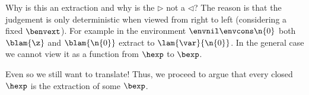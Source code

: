 Why is this an extraction and why is the $\rhd$ not a $\lhd$?
The reason is that the judgement is only deterministic when viewed from right to left (considering a fixed $\benvext$).
For example in the environment $\envnil \envcons \n{0}$ both $\blam{\z}$ and $\blam{\n{0}}$ extract to $\lam{\var}{\n{0}}$.
In the general case we cannot view it as a function from $\hexp$ to $\bexp$.

Even so we still want to translate!
Thus, we proceed to argue that every closed $\hexp$ is the extraction of some $\bexp$.

